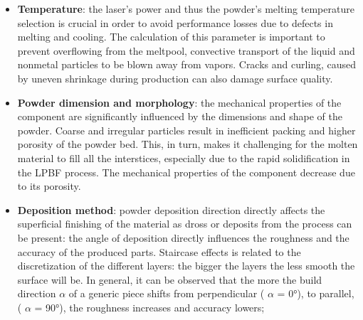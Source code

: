\begin{itemize}
    \item \textbf{Temperature}: the laser's power and thus the powder's melting temperature selection is crucial in order to avoid performance losses due to defects in melting and cooling. The calculation of this parameter is important to prevent overflowing from the meltpool, convective transport of the liquid and nonmetal particles to be blown away from vapors. Cracks and curling, caused by uneven shrinkage during production can also damage surface quality\cite{lpbf_accuracy}. 
    \item  \textbf{Powder dimension and morphology}: the mechanical properties of the component are significantly influenced by the dimensions and shape of the powder. Coarse and irregular particles result in inefficient packing and higher porosity of the powder bed. This, in turn, makes it challenging for the molten material to fill all the interstices, especially due to the rapid solidification in the LPBF process. The mechanical properties of the component decrease due to its porosity\cite{dimension_powder}.
    \item  \textbf{Deposition method}: powder deposition direction directly affects the superficial finishing of the material as dross or deposits from the process can be present: the angle of deposition directly influences the roughness and the accuracy of the produced parts. Staircase effects is related to the discretization of the different layers: the bigger the layers the less smooth the surface will be. In general, it can be observed that the more the build direction $\alpha$ of a generic piece shifts from perpendicular ( $\alpha$ = 0°), to parallel, ( $\alpha$ = 90°), the roughness increases and accuracy lowers\cite{tesi_dottorato};
\end{itemize}

